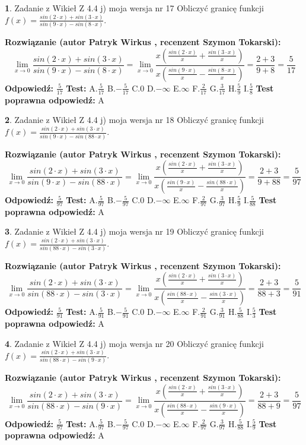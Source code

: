 \documentclass[12pt, a4paper]{article}
\theoremstyle{definition} %
\newtheorem{zad}{}
\newcommand{\zadStart}[1]{\begin{zad}#1\newline}
\newcommand{\zadStop}{\end{zad}}
\newcommand{\rozwStart}[2]{\noindent \textbf{Rozwiązanie (autor #1 , recenzent #2): }\newline}
\newcommand{\rozwStop}{\newline}
\newcommand{\odpStart}{\noindent \textbf{Odpowiedź:}\newline}
\newcommand{\odpStop}{\newline}
\newcommand{\testStart}{\noindent \textbf{Test:}\newline}
\newcommand{\testStop}{\newline}
\newcommand{\kluczStart}{\noindent \textbf{Test poprawna odpowiedź:}\newline}
\newcommand{\kluczStop}{\newline}
\begin{document}
\zadStart{Zadanie z Wikieł Z 4.4 j) moja wersja nr 17}
Obliczyć granicę funkcji $f(x)=\frac{sin(2\cdot x) +sin(3\cdot x)}{sin(9\cdot x) -sin(8\cdot x)}$.
\zadStop
\rozwStart{Patryk Wirkus}{Szymon Tokarski}
$$\lim\limits_{x\to 0}\frac{sin(2\cdot x) +sin(3\cdot x)}{sin(9\cdot x) -sin(8\cdot x)}=\lim\limits_{x\to 0}\frac{x(\frac{sin(2\cdot x)}{x}+\frac{sin(3\cdot x)}{x})}{x(\frac{sin(9\cdot x)}{x}-\frac{sin(8\cdot x)}{x})}=\frac{2+3}{9+8} = \frac{5}{17}$$
\rozwStop
\odpStart
$\frac{5}{17}$
\odpStop
\testStart
A.$\frac{5}{17}$
B.$-\frac{5}{17}$
C.$0$
D.$-\infty$
E.$\infty$
F.$\frac{2}{17}$
G.$\frac{3}{17}$
H.$\frac{5}{9}$
I.$\frac{5}{8}$
\testStop
\kluczStart
A
\kluczStop



\zadStart{Zadanie z Wikieł Z 4.4 j) moja wersja nr 18}
Obliczyć granicę funkcji $f(x)=\frac{sin(2\cdot x) +sin(3\cdot x)}{sin(9\cdot x) -sin(88\cdot x)}$.
\zadStop
\rozwStart{Patryk Wirkus}{Szymon Tokarski}
$$\lim\limits_{x\to 0}\frac{sin(2\cdot x) +sin(3\cdot x)}{sin(9\cdot x) -sin(88\cdot x)}=\lim\limits_{x\to 0}\frac{x(\frac{sin(2\cdot x)}{x}+\frac{sin(3\cdot x)}{x})}{x(\frac{sin(9\cdot x)}{x}-\frac{sin(88\cdot x)}{x})}=\frac{2+3}{9+88} = \frac{5}{97}$$
\rozwStop
\odpStart
$\frac{5}{97}$
\odpStop
\testStart
A.$\frac{5}{97}$
B.$-\frac{5}{97}$
C.$0$
D.$-\infty$
E.$\infty$
F.$\frac{2}{97}$
G.$\frac{3}{97}$
H.$\frac{5}{9}$
I.$\frac{5}{88}$
\testStop
\kluczStart
A
\kluczStop



\zadStart{Zadanie z Wikieł Z 4.4 j) moja wersja nr 19}
Obliczyć granicę funkcji $f(x)=\frac{sin(2\cdot x) +sin(3\cdot x)}{sin(88\cdot x) -sin(3\cdot x)}$.
\zadStop
\rozwStart{Patryk Wirkus}{Szymon Tokarski}
$$\lim\limits_{x\to 0}\frac{sin(2\cdot x) +sin(3\cdot x)}{sin(88\cdot x) -sin(3\cdot x)}=\lim\limits_{x\to 0}\frac{x(\frac{sin(2\cdot x)}{x}+\frac{sin(3\cdot x)}{x})}{x(\frac{sin(88\cdot x)}{x}-\frac{sin(3\cdot x)}{x})}=\frac{2+3}{88+3} = \frac{5}{91}$$
\rozwStop
\odpStart
$\frac{5}{91}$
\odpStop
\testStart
A.$\frac{5}{91}$
B.$-\frac{5}{91}$
C.$0$
D.$-\infty$
E.$\infty$
F.$\frac{2}{91}$
G.$\frac{3}{91}$
H.$\frac{5}{88}$
I.$\frac{5}{3}$
\testStop
\kluczStart
A
\kluczStop



\zadStart{Zadanie z Wikieł Z 4.4 j) moja wersja nr 20}
Obliczyć granicę funkcji $f(x)=\frac{sin(2\cdot x) +sin(3\cdot x)}{sin(88\cdot x) -sin(9\cdot x)}$.
\zadStop
\rozwStart{Patryk Wirkus}{Szymon Tokarski}
$$\lim\limits_{x\to 0}\frac{sin(2\cdot x) +sin(3\cdot x)}{sin(88\cdot x) -sin(9\cdot x)}=\lim\limits_{x\to 0}\frac{x(\frac{sin(2\cdot x)}{x}+\frac{sin(3\cdot x)}{x})}{x(\frac{sin(88\cdot x)}{x}-\frac{sin(9\cdot x)}{x})}=\frac{2+3}{88+9} = \frac{5}{97}$$
\rozwStop
\odpStart
$\frac{5}{97}$
\odpStop
\testStart
A.$\frac{5}{97}$
B.$-\frac{5}{97}$
C.$0$
D.$-\infty$
E.$\infty$
F.$\frac{2}{97}$
G.$\frac{3}{97}$
H.$\frac{5}{88}$
I.$\frac{5}{9}$
\testStop
\kluczStart
A
\kluczStop
\end{document}
